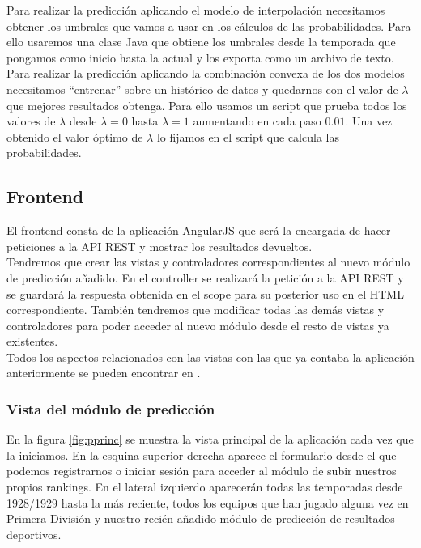 Para realizar la predicción aplicando el modelo de interpolación necesitamos obtener los umbrales que vamos a usar en los cálculos de las probabilidades. Para ello usaremos una clase Java que obtiene los umbrales desde la temporada que pongamos como inicio hasta la actual y los exporta como un archivo de texto.\\

Para realizar la predicción aplicando la combinación convexa de los dos modelos necesitamos ``entrenar'' sobre un histórico de datos y quedarnos con el valor de $\lambda$ que mejores resultados obtenga. Para ello usamos un script que prueba todos los valores de $\lambda$ desde $\lambda=0$ hasta $\lambda=1$ aumentando en cada paso $0.01$. Una vez obtenido el valor óptimo de $\lambda$ lo fijamos en el script que calcula las probabilidades.  

\subsection{Frontend}
El frontend consta de la aplicación AngularJS que será la encargada de hacer peticiones a la API REST y mostrar los resultados devueltos.\\

Tendremos que crear las vistas y controladores correspondientes al nuevo módulo de predicción añadido. En el controller se realizará la petición a la API REST y se guardará la respuesta obtenida en el scope para su posterior uso en el HTML correspondiente. También tendremos que modificar todas las demás vistas y controladores para poder acceder al nuevo módulo desde el resto de vistas ya existentes.\\

Todos los aspectos relacionados con las vistas con las que ya contaba la aplicación anteriormente se pueden encontrar en \cite[sección 3.4.1.]{tfgjose}.\\


\subsubsection{Vista del módulo de predicción}
En la figura \ref{fig:pprinc} se muestra la vista principal de la aplicación cada vez que la iniciamos. En la esquina superior derecha aparece el formulario desde el que podemos registrarnos o iniciar sesión para acceder al módulo de subir nuestros propios rankings. En el lateral izquierdo aparecerán todas las temporadas desde 1928/1929 hasta la más reciente, todos los equipos que han jugado alguna vez en Primera División y nuestro recién añadido módulo de predicción de resultados deportivos.\\

